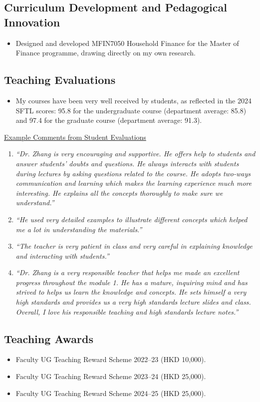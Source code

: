 \documentclass[11pt]{article}
\newcommand{\cvpub}[1]{\item #1}
\begin{document}
\subsection{Curriculum Development and Pedagogical Innovation}
\begin{itemize}
\item Designed and developed MFIN7050 Household Finance for the Master of Finance programme, drawing directly on my own research.
\end{itemize}

\subsection{Teaching Evaluations}
\begin{itemize}
\item My courses have been very well received by students, as reflected in the 2024 SFTL scores: 95.8 for the undergraduate course (department average: 85.8) and 97.4 for the graduate course (department average: 91.3).
\end{itemize}
\vspace{0.4em}
\noindent\underline{Example Comments from Student Evaluations}
\begin{enumerate}
\cvpub{\textit{``Dr. Zhang is very encouraging and supportive. He offers help to students and answer students' doubts and questions. He always interacts with students during lectures by asking questions related to the course. He adopts two-ways communication and learning which makes the learning experience much more interesting. He explains all the concepts thoroughly to make sure we understand.''}}
\cvpub{\textit{``He used very detailed examples to illustrate different concepts which helped me a lot in understanding the materials.''}}
\cvpub{\textit{``The teacher is very patient in class and very careful in explaining knowledge and interacting with students.''}}
\cvpub{\textit{``Dr. Zhang is a very responsible teacher that helps me made an excellent progress throughout the module 1. He has a mature, inquiring mind and has strived to helps us learn the knowledge and concepts. He sets himself a very high standards and provides us a very high standards lecture slides and class. Overall, I love his responsible teaching and high standards lecture notes.''}}
\end{enumerate}

\subsection{Teaching Awards}
\begin{itemize}
\item Faculty UG Teaching Reward Scheme 2022--23 (HKD 10,000).
\item Faculty UG Teaching Reward Scheme 2023--24 (HKD 25,000).
\item Faculty UG Teaching Reward Scheme 2024--25 (HKD 25,000).
\end{itemize}
\end{document}
